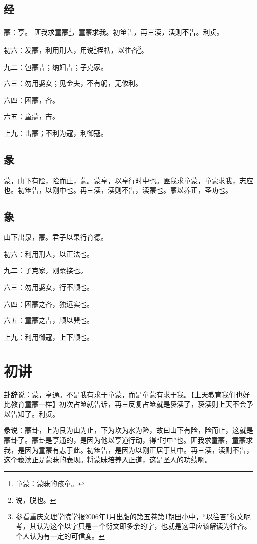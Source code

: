 \documentclass[12pt,oneside]{book}
\begin{document}
\subsection{经}
蒙：亨。 匪我求童蒙\footnote{童蒙：蒙昧的孩童。}，童蒙求我。初筮告，再三渎，渎则不告。利贞。

初六：发蒙，利用刑人，用说\footnote{说，脱也。}桎梏，以往吝\footnote{参看重庆文理学院学报2006年1月出版的第五卷第1期田小中，“以往吝”衍文呢考，其认为这个以字只是一个衍文即多余的字，也就是这里应该解读为往吝。个人认为有一定的可信度。}。

九二：包蒙吉；纳妇吉；子克家。

六三：勿用娶女；见金夫，不有躬，无攸利。

六四：困蒙，吝。

六五：童蒙，吉。

上九：击蒙；不利为寇，利御寇。

\subsection{彖}
蒙，山下有险，险而止，蒙。蒙亨，以亨行时中也。匪我求童蒙，童蒙求我，志应也。初筮告，以刚中也。再三渎，渎则不告，渎蒙也。蒙以养正，圣功也。


\subsection{象}
山下出泉，蒙。君子以果行育德。

初六：利用刑人，以正法也。

九二：子克家，刚柔接也。

六三：勿用娶女，行不顺也。

六四：困蒙之吝，独远实也。

六五：童蒙之吉，顺以巽也。

上九：利用御寇，上下顺也。

\section{初讲}
卦辞说：蒙，亨通。不是我有求于童蒙，而是童蒙有求于我。【上天教育我们也好比教育童蒙一样】初次占筮就告诉，再三反复占筮就是亵渎了，亵渎则上天不会予以告知了。利贞。

彖说：蒙卦，上为艮为山为止，下为坎为水为险，故曰山下有险，险而止，这就是蒙卦了。蒙卦是亨通的，是因为他以亨道行动，得“时中”也。匪我求童蒙，童蒙求我，是因为童蒙有志于此。初筮告，是因为以刚正居于其中。再三渎，渎则不告，这个亵渎正是蒙昧的表现。将蒙昧培养入正道，这是圣人的功绩啊。
\end{document}
